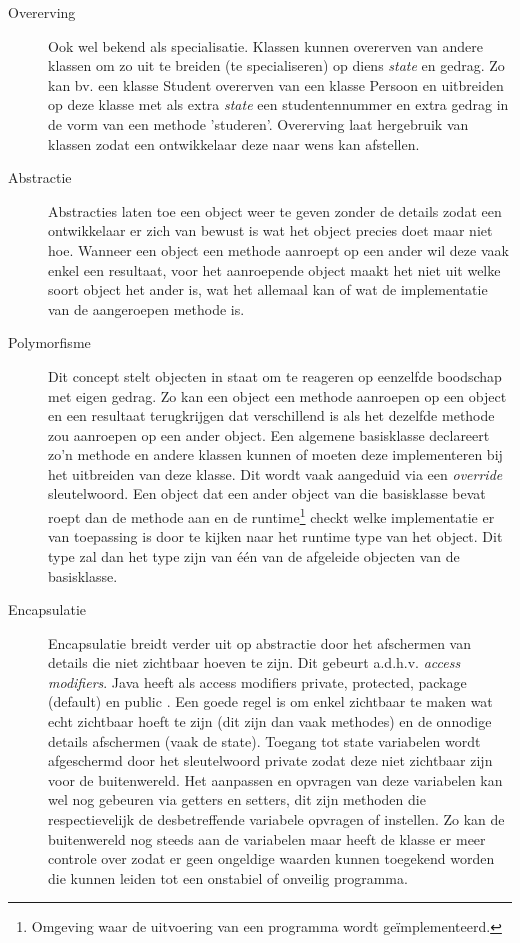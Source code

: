 \begin{description}
   \item[Overerving] Ook wel bekend als specialisatie. Klassen kunnen overerven van andere klassen om zo uit te breiden (te specialiseren) op diens \textit{state} en gedrag. Zo kan bv. een klasse Student overerven van een klasse Persoon en uitbreiden op deze klasse met als extra \textit{state} een studentennummer en extra gedrag in de vorm van een methode 'studeren'. 
    Overerving laat hergebruik van klassen zodat een ontwikkelaar deze naar wens kan afstellen. 
    \item[Abstractie] Abstracties laten toe een object weer te geven zonder de details zodat een ontwikkelaar er zich van bewust is wat het object precies doet maar niet hoe. Wanneer een object een methode aanroept op een ander wil deze vaak enkel een resultaat, voor het aanroepende object maakt het niet uit welke soort object het ander is, wat het allemaal kan of wat de implementatie van de aangeroepen methode is.
    \item[Polymorfisme] Dit concept stelt objecten in staat om te reageren op eenzelfde boodschap met eigen gedrag. Zo kan een object een methode aanroepen op een object en een resultaat terugkrijgen dat verschillend is als het dezelfde methode zou aanroepen op een ander object. Een algemene basisklasse declareert zo'n methode en andere klassen kunnen of moeten deze implementeren bij het uitbreiden van deze klasse. Dit wordt vaak aangeduid via een \textit{override} sleutelwoord. Een object dat een ander object van die basisklasse bevat roept dan de methode aan en de runtime\footnote{Omgeving waar de uitvoering van een programma wordt geïmplementeerd.} \autocite{Aho1986} checkt welke implementatie er van toepassing is door te kijken naar het runtime type van het object. Dit type zal dan het type zijn van één van de afgeleide objecten van de basisklasse.
    \item[Encapsulatie] Encapsulatie breidt verder uit op abstractie door het afschermen van details die niet zichtbaar hoeven te zijn. Dit gebeurt a.d.h.v. \textit{access modifiers}. Java heeft als access modifiers private, protected, package (default) en public \autocite{Deitel2015}. Een goede regel is om enkel zichtbaar te maken wat echt zichtbaar hoeft te zijn (dit zijn dan vaak methodes) en de onnodige details afschermen (vaak de state). Toegang tot state variabelen wordt afgeschermd door het sleutelwoord private zodat deze niet zichtbaar zijn voor de buitenwereld. Het aanpassen en opvragen van deze variabelen kan wel nog gebeuren via getters en setters, dit zijn methoden die respectievelijk de desbetreffende variabele opvragen of instellen. Zo kan de buitenwereld nog steeds aan de variabelen maar heeft de klasse er meer controle over zodat er geen ongeldige waarden kunnen toegekend worden die kunnen leiden tot een onstabiel of onveilig programma.
\end{description}

